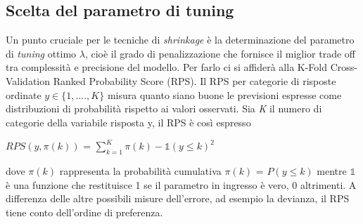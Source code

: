 
\subsection{Scelta del parametro di tuning}
Un punto cruciale per le tecniche di \emph{shrinkage} è la determinazione del parametro di \emph{tuning} ottimo $\lambda$, cioè il grado di penalizzazione che fornisce il miglior trade off tra complessità e precisione del modello. Per farlo ci si affiderà alla K-Fold Cross-Validation Ranked Probability Score (RPS). Il RPS \autocite{gneiting2007strictly} per categorie di risposte ordinate $y \in \{1,....,K\}$  misura quanto siano buone le previsioni espresse come distribuzioni di probabilità rispetto ai valori osservati.
Sia \emph{K} il numero di categorie della variabile risposta y, il RPS è così espresso 
\begin{center}
	$ RPS(y,\pi(k))$ = $\sum^{K}_{k = 1}{\pi(k) -  \mathds{1} (y \le k)}^2$ 
\end{center}
dove $\pi(k)$ rappresenta la probabilità cumulativa $\pi(k)$ = $P(y \le k)$ mentre $\mathds{1}$ è una funzione che restituisce 1 se il parametro in ingresso è vero, 0 altrimenti. A differenza delle altre possibili misure dell'errore, ad esempio la devianza, il RPS tiene conto dell'ordine di preferenza.




